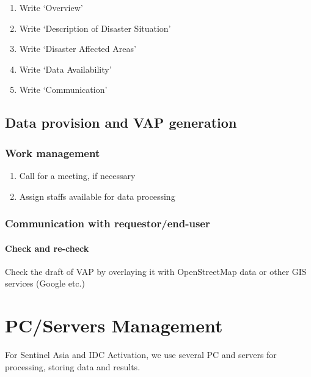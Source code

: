 \documentclass[]{book}
\providecommand{\tightlist}{%
  \setlength{\itemsep}{0pt}\setlength{\parskip}{0pt}}
\theoremstyle{definition}
\theoremstyle{definition}
\theoremstyle{definition}
\theoremstyle{remark}
\begin{document}
\begin{enumerate}
\def\labelenumi{\arabic{enumi}.}
\tightlist
\item
  Write `Overview'
\item
  Write `Description of Disaster Situation'
\item
  Write `Disaster Affected Areas'
\item
  Write `Data Availability'
\item
  Write `Communication'
\end{enumerate}

\section{Data provision and VAP
generation}\label{data-provision-and-vap-generation}

\subsection{Work management}\label{work-management-1}

\begin{enumerate}
\def\labelenumi{\arabic{enumi}.}
\tightlist
\item
  Call for a meeting, if necessary
\item
  Assign staffs available for data processing
\end{enumerate}

\subsection{Communication with
requestor/end-user}\label{communication-with-requestorend-user}

\subsubsection{Check and re-check}\label{check-and-re-check}

Check the draft of VAP by overlaying it with OpenStreetMap data or other
GIS services (Google etc.)

\chapter{PC/Servers Management}\label{pcservers-management}

For Sentinel Asia and IDC Activation, we use several PC and servers for
processing, storing data and results.
\end{document}

